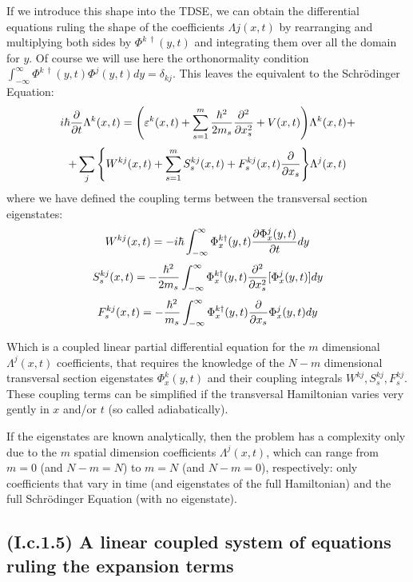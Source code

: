 \documentclass[11pt, a4paper]{article} %
\begin{document}
If we introduce this shape into the TDSE, we can obtain the differential equations ruling the shape of the coefficients $\Lambda j(x,t)$ by rearranging and multiplying both sides by $\Phi^{k\ \dagger}(y,t)$ and integrating them over all the domain for $y$. Of course we will use here the orthonormality condition $\int_{-\infty}^{\infty}\Phi^{k\ \dagger}(y,t) \Phi^{j}(y,t) dy= \delta_{kj}$. This leaves the equivalent to the Schrödinger Equation:
\begin{equation}\label{XabEq}
i\hbar \pdv{}{t}\Lambda^k(x,t) = \qty( \varepsilon^k(x,t) + \sum_{s=1}^m\frac{\hbar^2}{2m_s}\pdv[2]{}{x_s}+V(x,t))\Lambda^k(x,t)+
\end{equation}
$$
 +\sum_j \qty{ W^{kj}(x,t) + \sum_{s=1}^m S^{kj}_s(x,t)+F^{kj}_s(x,t)\pdv{}{x_s} } \Lambda^j(x,t) 
$$
where we have defined the coupling terms between the transversal section eigenstates:
\begin{equation}
W^{kj}(x,t) = -i\hbar\int_{-\infty}^{\infty}\Phi_x^{k\dagger}(y,t) \pdv{\Phi^j_x(y,t)}{t} dy
\end{equation}
\begin{equation}\label{S}
S^{kj}_s(x,t) = -\frac{\hbar^2}{2m_s}\int_{-\infty}^{\infty}\Phi_x^{k\dagger}(y,t) \pdv[2]{}{x_s} [\Phi^j_x(y,t)] dy
\end{equation}
\begin{equation}\label{F}
F^{kj}_s(x,t) = -\frac{\hbar^2}{m_s}\int_{-\infty}^{\infty}\Phi_x^{k\dagger}(y,t) \pdv{}{x_s}\Phi^j_x(y,t) dy
\end{equation}

Which is a coupled linear partial differential equation for the $m$ dimensional $\Lambda^j(x,t)$ coefficients, that requires the knowledge of the $N-m$ dimensional transversal section eigenstates $\Phi^k_x(y,t)$ and their coupling integrals $W^{kj}, S^{kj}_s, F^{kj}_s$. These coupling terms can be simplified if the transversal Hamiltonian varies very gently in $x$ and/or $t$ (so called adiabatically).

If the eigenstates are known analytically, then the problem has a complexity only due to the $m$ spatial dimension coefficients $\Lambda^j(x,t)$, which can range from $m=0$ (and $N-m=N$) to $m=N$ (and $N-m=0$), respectively: only coefficients that vary in time (and eigenstates of the full Hamiltonian) and the full Schrödinger Equation (with no eigenstate).

\subsection*{(I.c.1.5) A linear coupled system of equations ruling the expansion terms}
\end{document}
